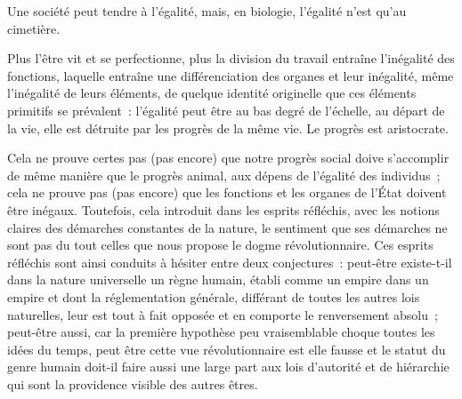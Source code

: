 \documentclass[french,twoside]{book} %
\newcommand{\astermono}{\medskip\centerline{\color{rubric}\large\selectfont{\syms ✻}}\medskip\par}%
\begin{document}
\astermono

\noindent Une société peut tendre à l’égalité, mais, en biologie, l’égalité n’est qu’au cimetière.\par
Plus l’être vit et se perfectionne, plus la division du travail entraîne l’inégalité des fonctions, laquelle entraîne une différenciation des organes et leur inégalité, même l’inégalité de leurs éléments, de quelque identité originelle que ces éléments primitifs se prévalent : l’égalité peut être au bas degré de l’échelle, au départ de la vie, elle est détruite par les progrès de la même vie. Le progrès est aristocrate.\par
Cela ne prouve certes pas (pas encore) que notre progrès social doive s’accomplir de même manière que le progrès animal, aux dépens de l’égalité des individus ; cela ne prouve pas (pas encore) que les fonctions et les organes de l’État doivent être inégaux. Toutefois, cela introduit dans les esprits réfléchis, avec les notions claires des démarches constantes de la nature, le sentiment que ses démarches ne sont pas du tout celles que nous propose le dogme révolutionnaire. Ces esprits réfléchis sont ainsi conduits à hésiter entre deux conjectures : peut-être existe-t-il dans la nature universelle un règne humain, établi comme un empire dans un empire et dont la réglementation générale, différant de toutes les autres lois naturelles, leur est tout à fait opposée et en comporte le renversement absolu ; peut-être aussi, car la première hypothèse peu vraisemblable choque toutes les idées du temps, peut être cette vue révolutionnaire est elle fausse et le statut du genre humain doit-il faire aussi une large part aux lois d’autorité et de hiérarchie qui sont la providence visible des autres êtres.\par

\astermono
\end{document}
